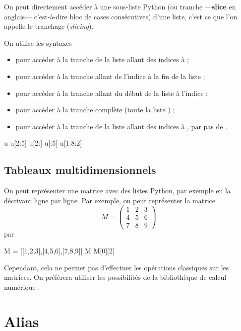 On peut directement accéder à une sous-liste Python (ou tranche ---\textbf{slice} en anglais--- 
c'est-à-dire bloc de cases consécutives) d'une liste, c'est ce que l'on appelle le tranchage 
(\textit{slicing}).

On utilise les  syntaxes 
\begin{itemize}
  \item {} pour accéder à la tranche de la liste  allant des indices  à  ;
  \item {} pour accéder à la tranche allant de l'indice  à la fin de la liste  ;
  \item {} pour accéder à la tranche allant du début de la liste  à l'indice ;
  \item {} pour accéder à la tranche complète (toute la liste ) ;
  \item {} pour accéder à la tranche de la liste  allant des indices  à , par pas de .
\end{itemize}

\begin{pyconsole}
u
u[2:5]
u[2:]
u[:5]
u[1:8:2]
\end{pyconsole}

\subsection{Tableaux multidimensionnels}

On peut représenter une matrice avec des listes Python, par exemple en la décrivant ligne par 
ligne. 
Par exemple, on peut représenter la matrice 
\begin{equation*}
  M=\begin{pmatrix}
    1&2&3 \\ 4&5&6 \\ 7&8&9
  \end{pmatrix}
\end{equation*}
par
\begin{pyconsole}
M = [[1,2,3],[4,5,6],[7,8,9]]
M
M[0][2]
\end{pyconsole}
Cependant, cela ne permet pas d'effectuer les opérations classiques sur les matrices. On préférera 
utiliser les possibilités de la bibliothèque de calcul numérique .

\section{Alias}

